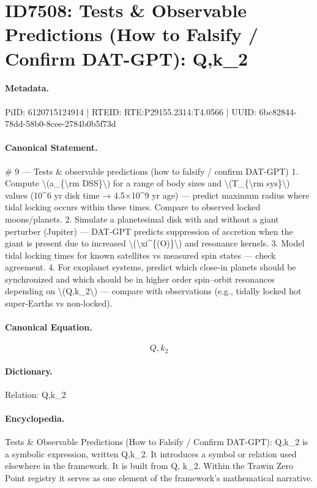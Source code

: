 \section*{ID7508: Tests \& Observable Predictions (How to Falsify / Confirm DAT-GPT): Q,k\_2}
\paragraph{Metadata.}
PiID: 6120715124914 | RTEID: RTE:P29155.2314:T4.0566 | UUID: 6bc82844-78dd-58b0-8cee-2784b0b5f73d

\paragraph{Canonical Statement.}
\# 9 — Tests \& observable predictions (how to falsify / confirm DAT-GPT) 1. Compute \textbackslash{}(a\_\{\textbackslash{}rm DSS\}\textbackslash{}) for a range of body sizes and \textbackslash{}(T\_\{\textbackslash{}rm sys\}\textbackslash{}) values (10\textasciicircum{}6 yr disk time → 4.5×10\textasciicircum{}9 yr age) — predict maximum radius where tidal locking occurs within these times. Compare to observed locked moons/planets. 2. Simulate a planetesimal disk with and without a giant perturber (Jupiter) — DAT-GPT predicts suppression of accretion when the giant is present due to increased \textbackslash{}(\textbackslash{}xi\textasciicircum{}\{(O)\}\textbackslash{}) and resonance kernels. 3. Model tidal locking times for known satellites vs measured spin states — check agreement. 4. For exoplanet systems, predict which close-in planets should be synchronized and which should be in higher order spin–orbit resonances depending on \textbackslash{}(Q,k\_2\textbackslash{}) — compare with observations (e.g., tidally locked hot super-Earths vs non-locked).

\paragraph{Canonical Equation.}
\[
Q,k_2
\]

\paragraph{Dictionary.}
Relation: Q,k\_2

\paragraph{Encyclopedia.}
Tests \& Observable Predictions (How to Falsify / Confirm DAT-GPT): Q,k\_2 is a symbolic expression, written Q,k\_2. It introduces a symbol or relation used elsewhere in the framework. It is built from Q, k\_2. Within the Trawin Zero Point registry it serves as one element of the framework's mathematical narrative.
